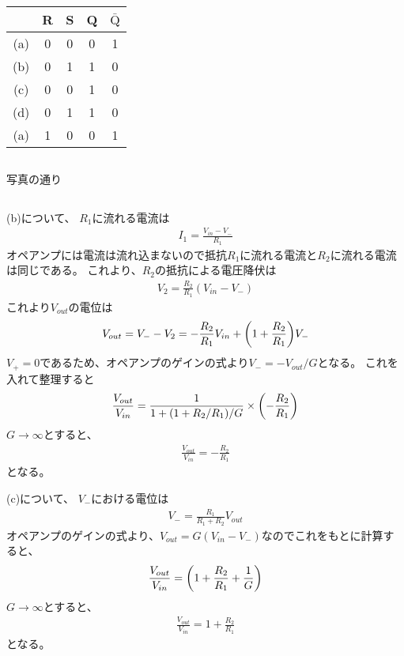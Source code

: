 \documentclass[../../master.tex]{subfiles}
\begin{document}
\subsection{}
\begin{tabular}{ccccc}
    \hline
    & R & S & Q & $\bar{\text{Q}}$\\
    \hline
    (a) & 0 & 0 & 0 & 1\\
    (b) & 0 & 1 & 1 & 0\\
    (c) & 0 & 0 & 1 & 0\\
    (d) & 0 & 1 & 1 & 0\\
    (a) & 1 & 0 & 0 & 1\\
    \hline
\end{tabular}
\subsection{}
写真の通り

\subsection{}
(b)について、
\(R_1\)に流れる電流は
\begin{align}
    I_1 = \frac{V_{in}-V_-}{R_1}
\end{align}
オペアンプには電流は流れ込まないので抵抗\(R_1\)に流れる電流と\(R_2\)に流れる電流は同じである。
これより、\(R_2\)の抵抗による電圧降伏は
\begin{align}
    V_2 = \frac{R_2}{R_1}(V_{in}-V_-)
\end{align}
これより\(V_{out}\)の電位は
\begin{align}
    V_{out} = V_- - V_2 = -\frac{R_2}{R_1}V_{in}+\qty(1+\frac{R_2}{R_1})V_-
\end{align}
\(V_+=0\)であるため、オペアンプのゲインの式より\(V_- = -V_{out}/G\)となる。
これを入れて整理すると
\begin{align}
    \frac{V_{out}}{V_{in}} = \frac{1}{1+(1+R_2/R_1)/G}\times \qty(-\frac{R_2}{R_1})
\end{align}
\(G\to\infty\)とすると、
\begin{align}
    \frac{V_{out}}{V_{in}} = -\frac{R_2}{R_1}
\end{align}
となる。

(c)について、
\(V_-\)における電位は
\begin{align}
    V_- = \frac{R_1}{R_1+R_2}V_{out}
\end{align}
オペアンプのゲインの式より、\(V_{out} = G(V_{in}-V_-)\)なのでこれをもとに計算すると、
\begin{align}
    \frac{V_{out}}{V_{in}} = \qty(1+\frac{R_2}{R_1}+\frac{1}{G})
\end{align}
\(G\to\infty\)とすると、
\begin{align}
    \frac{V_{out}}{V_{in}} = 1+\frac{R_2}{R_1}
\end{align}
となる。
\end{document}

